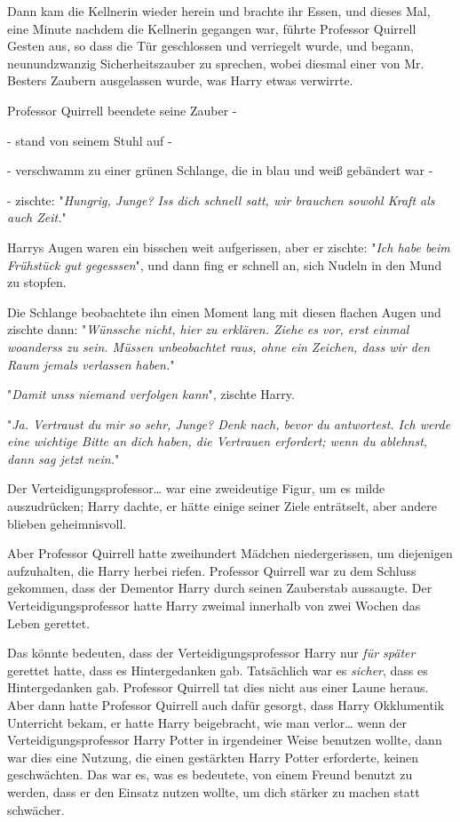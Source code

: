 {Dann kam die Kellnerin wieder herein und brachte ihr Essen, und dieses Mal, eine Minute nachdem die Kellnerin gegangen war, führte Professor Quirrell Gesten aus, so dass die Tür geschlossen und verriegelt wurde, und begann, neunundzwanzig Sicherheitszauber zu sprechen, wobei diesmal einer von Mr. Besters Zaubern ausgelassen wurde, was Harry etwas verwirrte.

Professor Quirrell beendete seine Zauber -

- stand von seinem Stuhl auf -

- verschwamm zu einer grünen Schlange, die in blau und weiß gebändert war -

- zischte: "\emph{Hungrig, Junge? Iss dich schnell satt, wir brauchen sowohl Kraft als auch Zeit.}"

Harrys Augen waren ein bisschen weit aufgerissen, aber er zischte: "\emph{Ich habe beim Frühstück gut gegesssen}", und dann fing er schnell an, sich Nudeln in den Mund zu stopfen.

Die Schlange beobachtete ihn einen Moment lang mit diesen flachen Augen und zischte dann: "\emph{Wünssche nicht, hier zu erklären. Ziehe es vor, erst einmal woanderss zu sein. Müssen unbeobachtet raus, ohne ein Zeichen, dass wir den Raum jemals verlassen haben.}"

"\emph{Damit unss niemand verfolgen kann}", zischte Harry.

"\emph{Ja. Vertraust du mir so sehr, Junge? Denk nach, bevor du antwortest. Ich werde eine wichtige Bitte an dich haben, die Vertrauen erfordert; wenn du ablehnst, dann sag jetzt nein.}"

Der Verteidigungsprofessor… war eine zweideutige Figur, um es milde auszudrücken; Harry dachte, er hätte einige seiner Ziele enträtselt, aber andere blieben geheimnisvoll.

Aber Professor Quirrell hatte zweihundert Mädchen niedergerissen, um diejenigen aufzuhalten, die Harry herbei riefen. Professor Quirrell war zu dem Schluss gekommen, dass der Dementor Harry durch seinen Zauberstab aussaugte. Der Verteidigungsprofessor hatte Harry zweimal innerhalb von zwei Wochen das Leben gerettet.

Das könnte bedeuten, dass der Verteidigungsprofessor Harry nur \emph{für später} gerettet hatte, dass es Hintergedanken gab. Tatsächlich war es \emph{sicher}, dass es Hintergedanken gab. Professor Quirrell tat dies nicht aus einer Laune heraus. Aber dann hatte Professor Quirrell auch dafür gesorgt, dass Harry Okklumentik Unterricht bekam, er hatte Harry beigebracht, wie man verlor… wenn der Verteidigungsprofessor Harry Potter in irgendeiner Weise benutzen wollte, dann war dies eine Nutzung, die einen gestärkten Harry Potter erforderte, keinen geschwächten. Das war es, was es bedeutete, von einem Freund benutzt zu werden, dass er den Einsatz nutzen wollte, um dich stärker zu machen statt schwächer.

}
